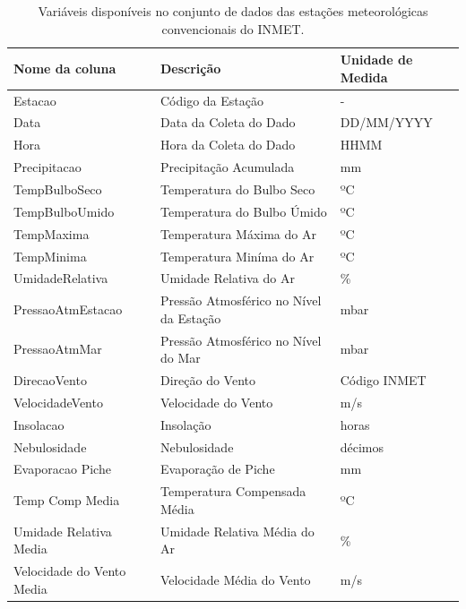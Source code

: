 \begin{table}[h!]
\caption{Variáveis disponíveis no conjunto de dados das estações meteorológicas convencionais do INMET.}
\label{tab:variaveis_estacoes_convencionais}
\begin{adjustbox}{width=\textwidth}
\begin{tabular}{|l|l|l|} %
\hline
\textbf{Nome da coluna} & \textbf{Descrição} & \textbf{Unidade de Medida}\\
\hline
Estacao & Código da Estação  & - \\
\hline
Data & Data da Coleta do Dado  & DD/MM/YYYY\\
\hline
Hora & Hora da Coleta do Dado  & HHMM\\
\hline
Precipitacao & Precipitação Acumulada  & mm\\
\hline
TempBulboSeco  & Temperatura do Bulbo Seco & ºC\\
\hline
TempBulboUmido & Temperatura do Bulbo Úmido & ºC\\
\hline
TempMaxima  & Temperatura Máxima do Ar & ºC\\
\hline
TempMinima  & Temperatura Miníma do Ar & ºC\\
\hline
UmidadeRelativa  & Umidade Relativa do Ar & \% \\
\hline
PressaoAtmEstacao  & Pressão Atmosférico no Nível da Estação & mbar \\
\hline
PressaoAtmMar  & Pressão Atmosférico no Nível do Mar & mbar \\
\hline
DirecaoVento  & Direção do Vento & Código INMET\\
\hline
VelocidadeVento  & Velocidade do Vento & m/s\\
\hline
Insolacao  & Insolação & horas\\
\hline
Nebulosidade & Nebulosidade & décimos \\
\hline
Evaporacao Piche & Evaporação de Piche & mm\\
\hline
Temp Comp Media & Temperatura Compensada Média & ºC\\
\hline
Umidade Relativa Media & Umidade Relativa Média do Ar & \% \\
\hline
Velocidade do Vento Media & Velocidade Média do Vento & m/s\\
\hline
\end{tabular}
\end{adjustbox}
\end{table}


